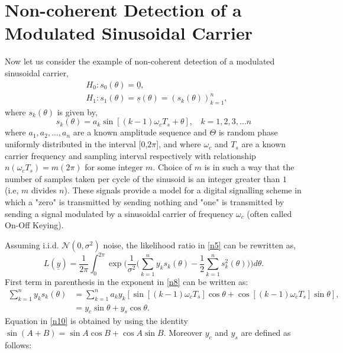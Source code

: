 \documentclass[a4paper,english,12pt]{article}
\begin{document}
\section{Non-coherent Detection of a Modulated Sinusoidal Carrier}
\par Now let us consider the example of non-coherent detection of a modulated sinusoidal carrier,
\begin{equation*}
      \begin{aligned}
      & H_0 : s_0(\theta)=\underline{0}, \\
      & H_1 : s_1(\theta)=\underline{s}(\theta) = (s_k(\theta))_{k=1}^n,
      \end{aligned}
\end{equation*}
 where $s_k(\theta)$ is given by,
 \begin{equation*}
     s_k(\theta) = a_k \sin[(k-1)\omega_c T_s+\theta],\ \ \ \ k=1,2,3,...n
 \end{equation*}
where $a_1,a_2,...,a_n$ are a known amplitude sequence and $\Theta$ is random phase uniformly distributed in the interval [0,$2\pi$], and where $\omega_c$ and $T_s$ are a known carrier frequency and sampling interval respectively with relationship $n(\omega_cT_s)=m(2\pi)$ for some integer $m$. Choice of $m$ is in such a way that the number of samples taken per cycle of the sinusoid is an integer greater than $1$ (i.e, $m$ divides $n$). These signals provide a model for a digital signalling scheme in which a "zero" is transmitted by sending nothing and "one" is transmitted by sending a signal modulated by a sinusoidal carrier of frequency $\omega_c$ (often called On-Off Keying). 
\par Assuming i.i.d. $\mathcal{N}(0,\sigma^2)$ noise, the likelihood ratio in \eqref{n5} can be rewritten as,
\begin{equation}
 \label{n8}
 L(\underline{y})=\frac{1}{2\pi}\int_{0}^{2\pi} \exp\bigg(\frac{1}{\sigma^2}\big(\sum_{k=1}^{n}y_k s_k(\theta)-\frac{1}{2}\sum_{k=1}^{n}s_k^2(\theta)\big)
\bigg)d\theta.
\end{equation}
First term in parenthesis in the exponent in \eqref{n8} can be written as:
\begin{align}
\sum_{k=1}^{n}y_k s_k(\theta) &= \sum_{k=1}^{n} a_k y_k[\sin[(k-1)\omega_c T_s] \cos\theta+\cos[(k-1)\omega_c T_s] \sin\theta], \\
 \label{n10}
&= y_c \sin\theta +y_s \cos\theta.
\end{align}
Equation in \eqref{n10} is obtained by using the identity $\sin(A+B)=\sin A\cos B+\cos A\sin B$. Moreover $y_c$ and $y_s$ are defined as follows:
\end{document}
